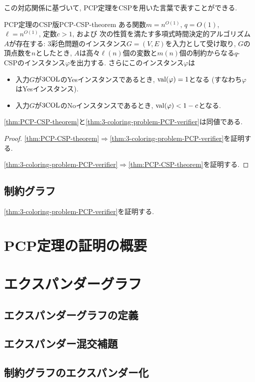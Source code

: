 この対応関係に基づいて, PCP定理をCSPを用いた言葉で表すことができる.

\begin{theorem}{PCP定理のCSP版}{PCP-CSP-theorem}
  ある関数$m=n^{O(1)}$, $q=O(1)$, $\ell=n^{O(1)}$, 定数$c>1$, および
  次の性質を満たす多項式時間決定的アルゴリズム$A$が存在する:
  3彩色問題のインスタンス$G=(V,E)$を入力として受け取り, $G$の頂点数を$n$としたとき, $A$は高々$\ell(n)$個の変数と$m(n)$個の制約からなる$q$-CSPのインスタンス$\varphi$を出力する.
  さらにこのインスタンス$\varphi$は
  \begin{itemize}
  \item 入力$G$が$\mathrm{3COL}$のYesインスタンスであるとき, $\mathrm{val}(\varphi) = 1  $となる (すなわち$\varphi$はYesインスタンス).
  \item 入力$G$が$\mathrm{3COL}$のNoインスタンスであるとき, $\mathrm{val}(\varphi) < 1-c$となる.
  \end{itemize}
\end{theorem}

\begin{lemma}{}{}
  \cref{thm:PCP-CSP-theorem}と\cref{thm:3-coloring-problem-PCP-verifier}は同値である.
\end{lemma}
\begin{proof}
  \cref{thm:PCP-CSP-theorem}$\Rightarrow$\cref{thm:3-coloring-problem-PCP-verifier}を証明する.

  \cref{thm:3-coloring-problem-PCP-verifier}$\Rightarrow$\cref{thm:PCP-CSP-theorem}を証明する.
\end{proof}

\subsection{制約グラフ}
\cref{thm:3-coloring-problem-PCP-verifier}を証明する.


\section{PCP定理の証明の概要}

\section{エクスパンダーグラフ}
\subsection{エクスパンダーグラフの定義}
\subsection{エクスパンダー混交補題}
\subsection{制約グラフのエクスパンダー化}